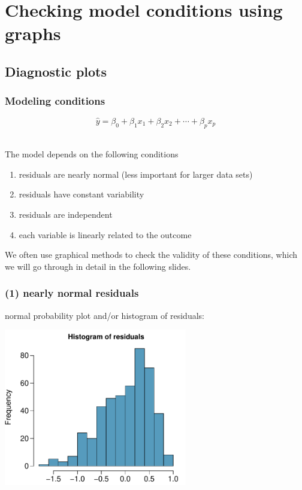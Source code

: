 
\section{Checking model conditions using graphs}


\subsection{Diagnostic plots}


\begin{frame}
\frametitle{Modeling conditions}

\[ \hat{y} = \beta_0 + \beta_1 x_1 + \beta_2 x_2 + \cdots + \beta_p x_p \] 

$\:$ \\

The model depends on the following conditions
\begin{enumerate}
\item residuals are nearly normal (less important for larger data sets)
\item residuals have constant variability
\item residuals are independent
\item each variable is linearly related to the outcome \\
\end{enumerate}

We often use graphical methods to check the validity of these conditions, which we will go through in detail in the following slides.

\end{frame}


\begin{frame}
\frametitle{(1) nearly normal residuals}

normal probability plot and/or histogram of residuals: \\

\begin{center}
\includegraphics[width=0.6\textwidth]{9-3_model_cond/figures/beauty/normal_res}
\end{center}


\end{frame}

